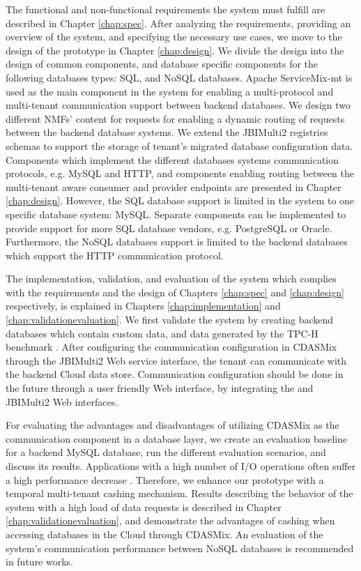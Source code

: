 The functional and non-functional requirements the system must fulfill are described in Chapter \ref{chap:spec}. After analyzing the requirements, providing an overview of the system, and specifying the necessary use cases, we move to the design of the prototype in Chapter \ref{chap:design}. We divide the design into the design of common components, and database specific components for the following databases types: \ac{SQL}, and \ac{NoSQL} databases. Apache ServiceMix-mt is used as the main component in the system for enabling a multi-protocol and multi-tenant communication support between backend databases. We design two different \ac{NMF}s' content for requests for enabling a dynamic routing of requests between the backend database systems. We extend the JBIMulti2 registries schemas to support the storage of tenant's migrated database configuration data. Components which implement the different databases systems communication protocols, e.g. MySQL and \ac{HTTP}, and components enabling routing between the multi-tenant aware consumer and provider endpoints are presented in Chapter \ref{chap:design}. However, the \ac{SQL} database support is limited in the system to one specific database system: MySQL. Separate components can be implemented to provide support for more \ac{SQL} database vendors, e.g. PostgreSQL or Oracle. Furthermore, the \ac{NoSQL} databases support is limited to the backend databases which support the \ac{HTTP} communication protocol. 

The implementation, validation, and evaluation of the system which complies with the requirements and the design of Chapters \ref{chap:spec} and \ref{chap:design} respectively, is explained in Chapters \ref{chap:implementation} and \ref{chap:validationevaluation}. We first validate the system by creating backend databases which contain custom data, and data generated by the TPC-H benchmark \cite{tcpbenchmark}. After configuring the communication configuration in CDASMix through the JBIMulti2 Web service interface, the tenant can communicate with the backend Cloud data store. Communication configuration should be done in the future through a user friendly Web interface, by integrating the  and JBIMulti2 Web interfaces. 

For evaluating the advantages and disadvantages of utilizing CDASMix as the communication component in a database layer, we create an evaluation baseline for a backend MySQL database, run the different evaluation scenarios, and discuss its results. Applications with a high number of I/O operations often suffer a high performance decrease \cite{cashing2012}. Therefore, we enhance our prototype with a temporal multi-tenant cashing mechanism. Results describing the behavior of the system with a high load of data requests is described in Chapter \ref{chap:validationevaluation}, and demonstrate the advantages of cashing when accessing databases in the Cloud through CDASMix. An evaluation of the system's communication performance between \ac{NoSQL} databases is recommended in future works.

